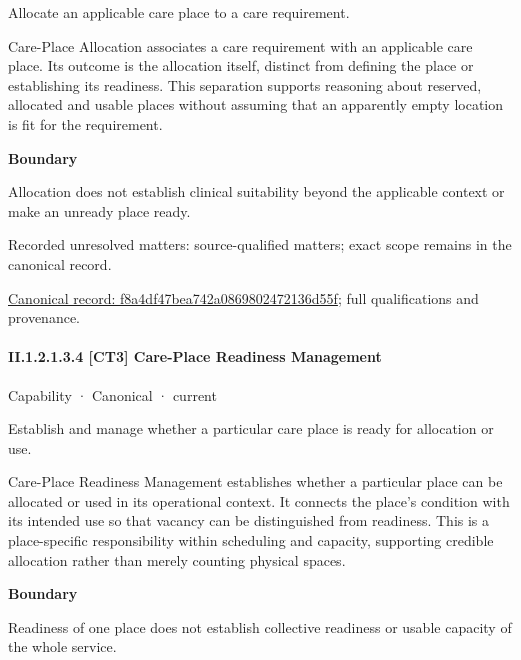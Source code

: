 Allocate an applicable care place to a care requirement.



Care-Place Allocation associates a care requirement with an applicable care place. Its outcome is the allocation itself, distinct from defining the place or establishing its readiness. This separation supports reasoning about reserved, allocated and usable places without assuming that an apparently empty location is fit for the requirement.



\textbf{Boundary}



Allocation does not establish clinical suitability beyond the applicable context or make an unready place ready.


{\small Recorded unresolved matters: source-qualified matters; exact scope remains in the canonical record.}\par
{\footnotesize \href{../../../../continuum/strategy/capability/f8a4df47bea742a0869802472136d55f.md}{Canonical record: f8a4df47bea742a0869802472136d55f}; full qualifications and provenance.}\par
\paragraph*{II.1.2.1.3.4 [CT3] Care-Place Readiness Management}
\label{navigation:II.1.2.1.3.4}

\label{element:4dd0f1b9f9334c5c80066a8974fdfb7a}
{\small Capability · Canonical · current}\par

Establish and manage whether a particular care place is ready for allocation or use.



Care-Place Readiness Management establishes whether a particular place can be allocated or used in its operational context. It connects the place's condition with its intended use so that vacancy can be distinguished from readiness. This is a place-specific responsibility within scheduling and capacity, supporting credible allocation rather than merely counting physical spaces.



\textbf{Boundary}



Readiness of one place does not establish collective readiness or usable capacity of the whole service.


